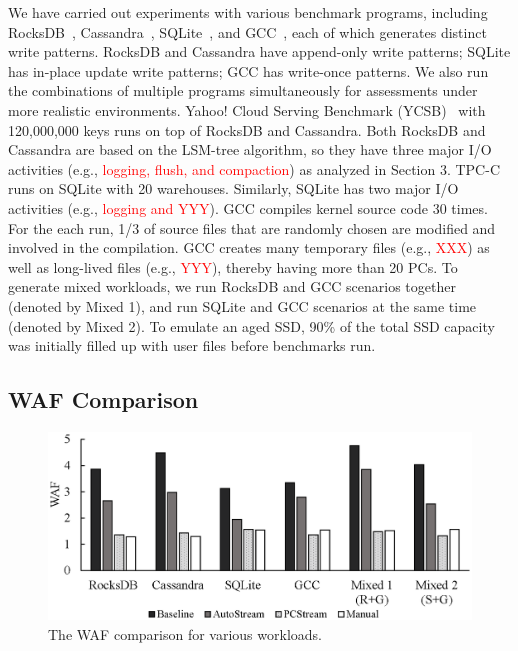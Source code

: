 We have carried out experiments with various benchmark programs, including
RocksDB~\cite{}, Cassandra~\cite{}, SQLite~\cite{}, and GCC~\cite{}, each of
which generates distinct write patterns.  RocksDB and Cassandra have
append-only write patterns; SQLite has in-place update write patterns; GCC has
write-once patterns.  We also run the combinations of multiple programs
simultaneously for assessments under more realistic environments.  Yahoo! Cloud
Serving Benchmark (YCSB)~\cite{YCSB} with 120,000,000 keys runs on top of
RocksDB and Cassandra.  Both RocksDB and Cassandra are based on the LSM-tree
algorithm, so they have three major I/O activities (e.g.,
\textcolor{red}{logging, flush, and compaction}) as analyzed in Section 3.
TPC-C~\cite{TPCC} runs on SQLite with 20 warehouses.  Similarly, SQLite has two
major I/O activities (e.g., \textcolor{red}{logging and YYY}). 
GCC compiles kernel source code 30 times. For the each run, 1/3 of source files
that are randomly chosen are modified and involved in the compilation.  GCC
creates many temporary files (e.g., \textcolor{red}{XXX}) as well as long-lived
files (e.g., \textcolor{red}{YYY}), thereby having more than 20 PCs.  To
generate mixed workloads, we run RocksDB and GCC scenarios together (denoted by
Mixed 1), and run SQLite and GCC scenarios at the same time (denoted by Mixed
2).
To emulate an aged SSD, 90\% of the total SSD capacity was initially filled up
with user files before benchmarks run.


\subsection{WAF Comparison}

\begin{figure}[t]
	\centering
	\includegraphics[width=0.9\linewidth]{figure/waf}
	\caption{The WAF comparison for various workloads.}
	\label{fig:waf}
\end{figure}

